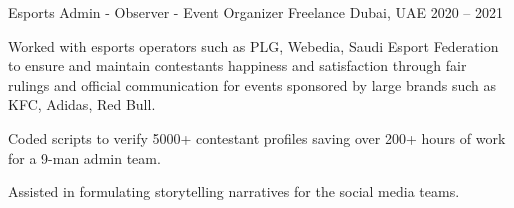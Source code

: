 \documentclass[]{awesome-cv}
\begin{document}
\begin{cventries}
	\vspace{1mm}

	\cventry
	{Esports Admin - Observer - Event Organizer}
	{Freelance}
	{Dubai, UAE}
	{2020 – 2021}
	{\begin{cvitems}
 		\item {Worked with esports operators such as PLG, Webedia, Saudi Esport Federation to ensure and maintain contestants happiness and satisfaction through fair rulings and official communication for events sponsored by large brands such as KFC, Adidas, Red Bull.}
		\item {Coded scripts to verify 5000+ contestant profiles saving over 200+ hours of work for a 9-man admin team.}
		\item {Assisted in formulating storytelling narratives for the social media teams.}
		\end{cvitems}}
\end{cventries}



\ 
\end{document}
